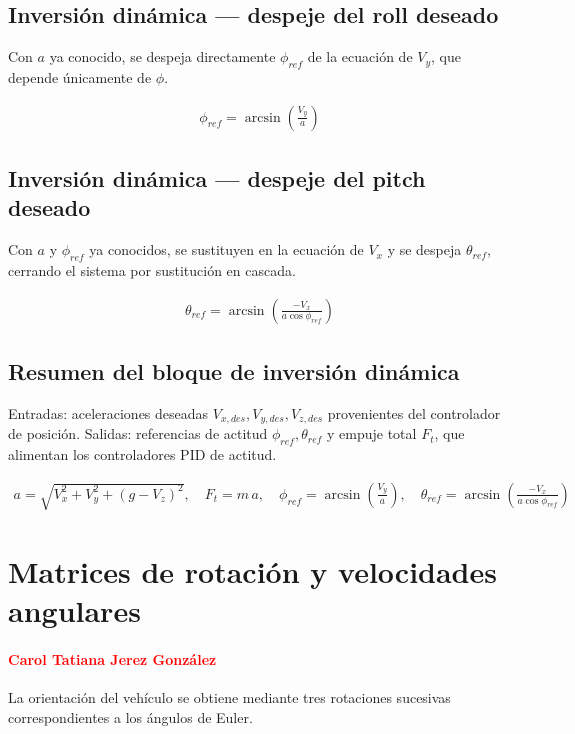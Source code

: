 \documentclass[11pt,a4paper]{article}
\begin{document}
\subsection*{Inversión dinámica --- despeje del roll deseado}

Con $a$ ya conocido, se despeja directamente $\phi_{ref}$ de la ecuación de $V_y$, que depende únicamente de $\phi$.

\begin{align}
\phi_{ref} = \arcsin\left(\frac{V_y}{a}\right)
\end{align}

\subsection*{Inversión dinámica --- despeje del pitch deseado}

Con $a$ y $\phi_{ref}$ ya conocidos, se sustituyen en la ecuación de $V_x$ y se despeja $\theta_{ref}$, cerrando el sistema por sustitución en cascada.

\begin{align}
\theta_{ref} = \arcsin\left(\frac{-V_x}{a\cos\phi_{ref}}\right)
\end{align}

\subsection*{Resumen del bloque de inversión dinámica}

Entradas: aceleraciones deseadas $V_{x,des}, V_{y,des}, V_{z,des}$ provenientes del controlador de posición. Salidas: referencias de actitud $\phi_{ref}, \theta_{ref}$ y empuje total $F_t$, que alimentan los controladores PID de actitud.

\begin{align}
a=\sqrt{V_x^2+V_y^2+(g-V_z)^2}, \quad
F_t = m\,a, \quad
\phi_{ref}=\arcsin\!\left(\frac{V_y}{a}\right), \quad
\theta_{ref}=\arcsin\!\left(\frac{-V_x}{a\cos\phi_{ref}}\right)
\end{align}



\section{Matrices de rotación y velocidades angulares}
\paragraph{\textcolor{red} {Carol Tatiana Jerez González}}
La orientación del vehículo se obtiene mediante tres rotaciones sucesivas correspondientes a los ángulos de Euler.
\end{document}
